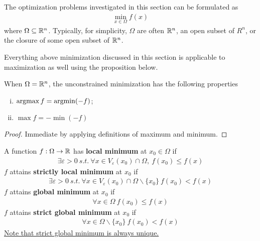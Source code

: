 \documentclass{article}
\begin{document}

    \par The optimization problems investigated in this section can be formulated as
    \begin{align}
    	\min_{x \in \Omega} f(x)
    \end{align}
    where $\Omega \subseteq \mathbb{R}^n$. Typically, for simplicity, $\Omega$ are often $\mathbb{R}^n$, an open subset of $R^n$, or the closure of some open subset of $\mathbb{R}^n$.
    \par Everything above minimization discussed in this section is applicable to maximization as well using the proposition below.

    \begin{proposition}
        When $\Omega = \mathbb{R}^n$, the unconstrained minimization has the following properties
        \begin{enumerate}[(i)]
            \item $\operatorname*{argmax} f = \operatorname*{argmin} (-f)$;
            \item $\max f = - \min (-f)$
        \end{enumerate}
    \end{proposition}
    
    \begin{proof}
    	Immediate by applying definitions of maximum and minimum.
    \end{proof}
   	
   	\begin{definition}
   		A function $f: \Omega \to \mathbb{R}$ has \textbf{local minimum} at $x_0 \in \Omega$ if
   		\begin{align}
   			\exists \varepsilon > 0\ s.t.\ \forall x \in V_\varepsilon(x_0) \cap \Omega,\  f(x_0) \leq f(x)
   		\end{align}
   		$f$ attains \textbf{strictly local minimum} at $x_0$ if
   		\begin{align}
   			\exists \varepsilon > 0\ s.t.\ \forall x \in V_\varepsilon(x_0) \cap \Omega \backslash \{x_0\}\ f(x_0) < f(x)
   		\end{align}
   		$f$ attains \textbf{global minimum} at $x_0$ if
   		\begin{align}
   			\forall x \in \Omega\ f(x_0) \leq f(x)
   		\end{align}
   		$f$ attains \textbf{strict global minimum} at $x_0$ if
   		\begin{align}
   			\forall x \in \Omega \backslash \{x_0\} \ f(x_0) < f(x)
   		\end{align}
   		\ul{Note that strict global minimum is always unique.}
   	\end{definition}
   	
\end{document}
